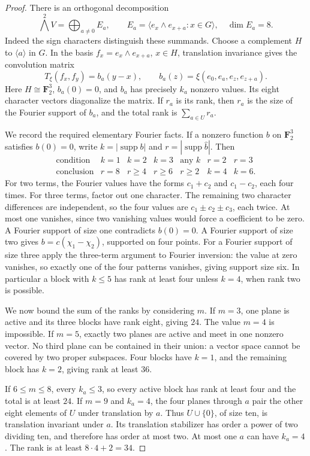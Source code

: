 \begin{proof}
There is an orthogonal decomposition
\[
 \bigwedge^2V=\bigoplus_{a\ne0}E_a,
 \qquad E_a=\langle e_x\wedge e_{x+a}:x\in G\rangle,
 \quad \dim E_a=8.
\]
Indeed the sign characters distinguish these summands. Choose a complement $H$ to $\langle a\rangle$ in $G$. In the basis $f_x=e_x\wedge e_{x+a}$, $x\in H$, translation invariance gives the convolution matrix
\[
 T_\xi(f_x,f_y)=b_a(y-x),\qquad
 b_a(z)=\xi(e_0,e_a,e_z,e_{z+a}).
\]
Here $H\cong\mathbf F_2^3$, $b_a(0)=0$, and $b_a$ has precisely $k_a$ nonzero values. Its eight character vectors diagonalize the matrix. If $r_a$ is its rank, then $r_a$ is the size of the Fourier support of $b_a$, and the total rank is $\sum_{a\in U}r_a$.

We record the required elementary Fourier facts. If a nonzero function $b$ on $\mathbf F_2^3$ satisfies $b(0)=0$, write $k=|\operatorname{supp}b|$ and $r=|\operatorname{supp}\widehat b|$. Then
\[
\begin{array}{c|cccccc}
\text{condition}&k=1&k=2&k=3&\text{any }k&r=2&r=3\\
\hline
\text{conclusion}&r=8&r\ge4&r\ge6&r\ge2&k=4&k=6.
\end{array}
\]
For two terms, the Fourier values have the forms $c_1+c_2$ and $c_1-c_2$, each four times. For three terms, factor out one character. The remaining two character differences are independent, so the four values are $c_1\pm c_2\pm c_3$, each twice. At most one vanishes, since two vanishing values would force a coefficient to be zero. A Fourier support of size one contradicts $b(0)=0$. A Fourier support of size two gives $b=c(\chi_1-\chi_2)$, supported on four points. For a Fourier support of size three apply the three-term argument to Fourier inversion: the value at zero vanishes, so exactly one of the four patterns vanishes, giving support size six. In particular a block with $k\le5$ has rank at least four unless $k=4$, when rank two is possible.

We now bound the sum of the ranks by considering $m$. If $m=3$, one plane is active and its three blocks have rank eight, giving $24$. The value $m=4$ is impossible. If $m=5$, exactly two planes are active and meet in one nonzero vector. No third plane can be contained in their union: a vector space cannot be covered by two proper subspaces. Four blocks have $k=1$, and the remaining block has $k=2$, giving rank at least $36$.

If $6\le m\le8$, every $k_a\le3$, so every active block has rank at least four and the total is at least $24$. If $m=9$ and $k_a=4$, the four planes through $a$ pair the other eight elements of $U$ under translation by $a$. Thus $U\cup\{0\}$, of size ten, is translation invariant under $a$. Its translation stabilizer has order a power of two dividing ten, and therefore has order at most two. At most one $a$ can have $k_a=4$. The rank is at least $8\cdot4+2=34$.


\end{proof}
